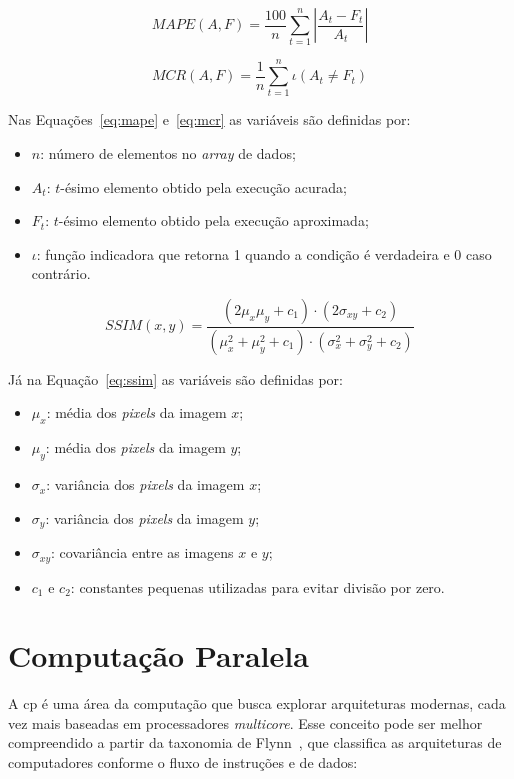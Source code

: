 \begin{equation}
    MAPE(A, F) = \frac{100}{n} \sum^{n}_{t=1}|\frac{A_t - F_t}{A_t}|
    \label{eq:mape}
\end{equation}

\begin{equation}
    MCR(A, F) = \frac{1}{n} \sum^{n}_{t=1} \iota (A_t \neq F_t)
    \label{eq:mcr}
\end{equation}

Nas Equações~\ref{eq:mape} e~\ref{eq:mcr} as variáveis são definidas por:
\begin{itemize}
    \item $n$: número de elementos no \textit{array} de dados;
    \item $A_t$: $t$-ésimo elemento obtido pela execução acurada;
    \item $F_t$: $t$-ésimo elemento obtido pela execução aproximada;
    \item $\iota$: função indicadora que retorna 1 quando a condição é verdadeira e 0 caso contrário.
\end{itemize}

\begin{equation}
    SSIM(x, y) = \frac{(2 \mu_x \mu_y + c_1) \cdot (2 \sigma_{xy} + c_2)}{(\mu_x^2 + \mu_y^2 + c_1) \cdot (\sigma_x^2 + \sigma_y^2 + c_2)}
    \label{eq:ssim}
\end{equation}

Já na Equação~\ref{eq:ssim} as variáveis são definidas por:
\begin{itemize}
    \item $\mu_x$: média dos \textit{pixels} da imagem $x$;
    \item $\mu_y$: média dos \textit{pixels} da imagem $y$;
    \item $\sigma_x$: variância dos \textit{pixels} da imagem $x$;
    \item $\sigma_y$: variância dos \textit{pixels} da imagem $y$;
    \item $\sigma_{xy}$: covariância entre as imagens $x$ e $y$;
    \item $c_1$ e $c_2$: constantes pequenas utilizadas para evitar divisão por zero.
\end{itemize}

\section{Computação Paralela}\label{sec:compParalela}

A \gls{cp} é uma área da computação que busca explorar arquiteturas modernas, cada vez mais baseadas em processadores \textit{multicore}. Esse conceito pode ser melhor compreendido a partir da taxonomia de Flynn~\cite{flynn1972}, que classifica as arquiteturas de computadores conforme o fluxo de instruções e de dados:

